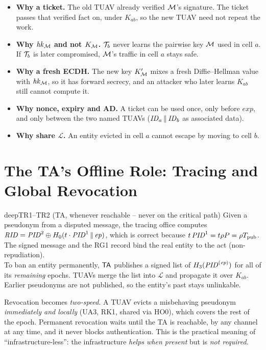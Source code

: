 \begin{whybox}
\begin{itemize}[leftmargin=*]
  \item \textbf{Why a ticket.} The old TUAV already verified $\mathcal{M}$'s signature. The ticket passes that verified fact on, under $K_{ab}$, so the new TUAV need not repeat the work.
  \item \textbf{Why $\mathit{hk}_{\mathcal{M}}$ and not $K_{\mathcal{M}}$.} $\mathcal{T}_b$ never learns the pairwise key $\mathcal{M}$ used in cell $a$. If $\mathcal{T}_b$ is later compromised, $\mathcal{M}$'s traffic in cell $a$ stays safe.
  \item \textbf{Why a fresh ECDH.} The new key $K'_{\mathcal{M}}$ mixes a fresh Diffie--Hellman value with $\mathit{hk}_{\mathcal{M}}$, so it has forward secrecy, and an attacker who later
        learns $K_{ab}$ still cannot compute it.
  \item \textbf{Why nonce, expiry and AD.} A ticket can be used once, only before $\mathit{exp}$, and only between the two named TUAVs ($\mathit{ID}_a\,\|\,\mathit{ID}_b$ as associated data).
  \item \textbf{Why share $\mathcal{L}$.} An entity evicted in cell $a$ cannot escape by moving to cell $b$.
\end{itemize}
\end{whybox}

\section{The TA's Offline Role: Tracing and Global Revocation}\label{sec:tr}
\begin{stepbox}{deep}{TR1--TR2 \;(TA, whenever reachable -- never on the critical path)}
 Given a pseudonym from a disputed message, the tracing office computes
$\mathit{RID}=\mathit{PID}^2\oplus H_0(t\cdot\mathit{PID}^1\,\|\,\mathit{ep})$, which is correct because $t\,\mathit{PID}^1=t\rho P=\rho T_{\mathrm{pub}}$. The signed message and the RG1 record bind the real
entity to the act (non-repudiation).\\[2pt]
 To ban an entity permanently, $\mathsf{TA}$ publishes a signed list of $H_3(\mathit{PID}^{(\mathit{ep})})$ for all of its \emph{remaining}
epochs. TUAVs merge the list into $\mathcal{L}$ and propagate it over $K_{ab}$. Earlier pseudonyms are not published, so the entity's past stays unlinkable.
\end{stepbox}
\begin{whybox}
Revocation becomes \emph{two-speed}. A TUAV evicts a misbehaving pseudonym \emph{immediately and locally} (UA3, RK1, shared via HO0), which covers the
rest of the epoch. Permanent revocation waits until the TA is reachable, by any channel at any time, and it never blocks authentication. This is the
practical meaning of ``infrastructure-less'': the infrastructure \emph{helps when present} but is \emph{not required}.
\end{whybox}
